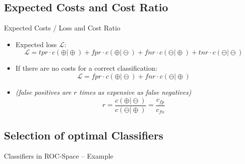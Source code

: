 \subsection{Expected Costs and Cost Ratio}

\begin{frame}{Expected Costs / Loss and Cost Ratio}{}
	\begin{itemize}
		\item Expected loss $\mathcal{L}$:
		\begin{equation}
			\mathcal{L} = tpr \cdot c(\oplus \vert \oplus) + fpr \cdot c(\oplus \vert \ominus) +
							fnr \cdot c(\ominus \vert \oplus) + tnr \cdot c(\ominus \vert \ominus)
		\end{equation}
		\item If there are no costs for a correct classification:
		\begin{equation}
			\mathcal{L} = fpr \cdot c(\oplus \vert \ominus) + fnr \cdot c(\ominus \vert \oplus)
		\end{equation}
		\item {} {\footnotesize \textit{(false positives are $r$ times as expensive as false negatives)}}
		\begin{equation}
			r = \frac{c(\oplus \vert \ominus)}{c(\ominus \vert \oplus)} = \frac{c_{fp}}{c_{fn}}
		\end{equation}
	\end{itemize}
\end{frame}


\subsection{Selection of optimal Classifiers}

\begin{frame}{Classifiers in ROC-Space -- Example}{}
	
\end{frame}


